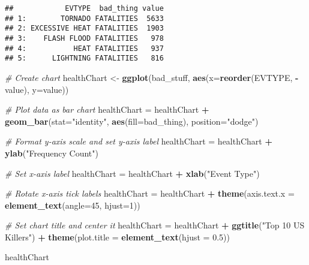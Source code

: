\documentclass[
]{article}
\newenvironment{Shaded}{\begin{snugshade}}{\end{snugshade}}
\newcommand{\CommentTok}[1]{\textcolor[rgb]{0.56,0.35,0.01}{\textit{#1}}}
\newcommand{\DataTypeTok}[1]{\textcolor[rgb]{0.13,0.29,0.53}{#1}}
\newcommand{\DecValTok}[1]{\textcolor[rgb]{0.00,0.00,0.81}{#1}}
\newcommand{\FloatTok}[1]{\textcolor[rgb]{0.00,0.00,0.81}{#1}}
\newcommand{\KeywordTok}[1]{\textcolor[rgb]{0.13,0.29,0.53}{\textbf{#1}}}
\newcommand{\NormalTok}[1]{#1}
\newcommand{\OperatorTok}[1]{\textcolor[rgb]{0.81,0.36,0.00}{\textbf{#1}}}
\newcommand{\StringTok}[1]{\textcolor[rgb]{0.31,0.60,0.02}{#1}}
\begin{document}
\begin{verbatim}
##            EVTYPE  bad_thing value
## 1:        TORNADO FATALITIES  5633
## 2: EXCESSIVE HEAT FATALITIES  1903
## 3:    FLASH FLOOD FATALITIES   978
## 4:           HEAT FATALITIES   937
## 5:      LIGHTNING FATALITIES   816
\end{verbatim}

\begin{Shaded}
\begin{Highlighting}[]
\CommentTok{# Create chart}
\NormalTok{healthChart <-}\StringTok{ }\KeywordTok{ggplot}\NormalTok{(bad_stuff, }\KeywordTok{aes}\NormalTok{(}\DataTypeTok{x=}\KeywordTok{reorder}\NormalTok{(EVTYPE, }\OperatorTok{-}\NormalTok{value), }\DataTypeTok{y=}\NormalTok{value))}

\CommentTok{# Plot data as bar chart}
\NormalTok{healthChart =}\StringTok{ }\NormalTok{healthChart }\OperatorTok{+}\StringTok{ }\KeywordTok{geom_bar}\NormalTok{(}\DataTypeTok{stat=}\StringTok{"identity"}\NormalTok{, }\KeywordTok{aes}\NormalTok{(}\DataTypeTok{fill=}\NormalTok{bad_thing), }\DataTypeTok{position=}\StringTok{"dodge"}\NormalTok{)}

\CommentTok{# Format y-axis scale and set y-axis label}
\NormalTok{healthChart =}\StringTok{ }\NormalTok{healthChart }\OperatorTok{+}\StringTok{ }\KeywordTok{ylab}\NormalTok{(}\StringTok{"Frequency Count"}\NormalTok{) }

\CommentTok{# Set x-axis label}
\NormalTok{healthChart =}\StringTok{ }\NormalTok{healthChart }\OperatorTok{+}\StringTok{ }\KeywordTok{xlab}\NormalTok{(}\StringTok{"Event Type"}\NormalTok{) }

\CommentTok{# Rotate x-axis tick labels }
\NormalTok{healthChart =}\StringTok{ }\NormalTok{healthChart }\OperatorTok{+}\StringTok{ }\KeywordTok{theme}\NormalTok{(}\DataTypeTok{axis.text.x =} \KeywordTok{element_text}\NormalTok{(}\DataTypeTok{angle=}\DecValTok{45}\NormalTok{, }\DataTypeTok{hjust=}\DecValTok{1}\NormalTok{))}

\CommentTok{# Set chart title and center it}
\NormalTok{healthChart =}\StringTok{ }\NormalTok{healthChart }\OperatorTok{+}\StringTok{ }\KeywordTok{ggtitle}\NormalTok{(}\StringTok{"Top 10 US Killers"}\NormalTok{) }\OperatorTok{+}\StringTok{ }\KeywordTok{theme}\NormalTok{(}\DataTypeTok{plot.title =} \KeywordTok{element_text}\NormalTok{(}\DataTypeTok{hjust =} \FloatTok{0.5}\NormalTok{))}

\NormalTok{healthChart}
\end{Highlighting}
\end{Shaded}
\end{document}
